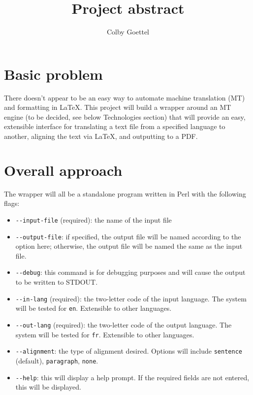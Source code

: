 \documentclass{article}
\title{Project abstract}
\author{Colby Goettel}
\begin{document}
\maketitle

\section{Basic problem}
There doesn't appear to be an easy way to automate machine translation (MT) and formatting in \LaTeX. This project will build a wrapper around an MT engine (to be decided, see below Technologies section) that will provide an easy, extensible interface for translating a text file from a specified language to another, aligning the text via \LaTeX, and outputting to a PDF.

\section{Overall approach}
The wrapper will all be a standalone program written in Perl with the following flags:
\begin{itemize}
    \item \verb+--input-file+ (required): the name of the input file
    \item \verb+--output-file+: if specified, the output file will be named according to the option here; otherwise, the output file will be named the same as the input file.
    \item \verb+--debug+: this command is for debugging purposes and will cause the output to be written to STDOUT.
    \item \verb+--in-lang+  (required): the two-letter code of the input language. The system will be tested for \texttt{en}. Extensible to other languages.
    \item \verb+--out-lang+ (required): the two-letter code of the output language. The system will be tested for \texttt{fr}. Extensible to other languages.
    \item \verb+--alignment+: the type of alignment desired. Options will include \texttt{sentence} (default), \texttt{paragraph}, \texttt{none}.
    \item \verb+--help+: this will display a help prompt. If the required fields are not entered, this will be displayed.
\end{itemize}
\end{document}

